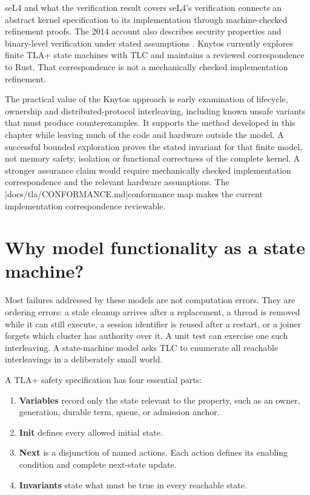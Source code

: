 \begin{architecturalcomparison}{seL4 and what the verification result covers}
seL4's verification connects an abstract kernel specification to its
implementation through machine-checked refinement proofs. The 2014 account
also describes security properties and binary-level verification under stated
assumptions \cite{prior:sel4}. Knytos currently explores finite TLA+
state machines with TLC and maintains a reviewed correspondence to Rust.
That correspondence is not a mechanically checked implementation refinement.

The practical value of the Knytos approach is early examination of
lifecycle, ownership and distributed-protocol interleaving, including known
unsafe variants that must produce counterexamples. It supports the method
developed in this chapter while leaving much of the code and hardware outside
the model. A successful bounded exploration proves the stated invariant for
that finite model, not memory safety, isolation or functional correctness of
the complete kernel. A stronger assurance claim would require mechanically
checked implementation correspondence and the relevant hardware assumptions.
The \repofiletext|docs/tla/CONFORMANCE.md|{conformance map} makes the current
implementation correspondence reviewable.
\end{architecturalcomparison}

\section{Why model functionality as a state machine?}

Most failures addressed by these models are not computation errors. They are
ordering errors: a stale cleanup arrives after a replacement, a thread is
removed while it can still execute, a session identifier is reused after a
restart, or a joiner forgets which cluster has authority over it. A unit test
can exercise one such interleaving. A state-machine model asks TLC to enumerate
all reachable interleavings in a deliberately small world.

A TLA+ safety specification has four essential parts:

\begin{enumerate}
    \item \textbf{Variables} record only the state relevant to the property,
        such as an owner, generation, durable term, queue, or admission anchor.
    \item \textbf{Init} defines every allowed initial state.
    \item \textbf{Next} is a disjunction of named actions. Each action defines
        its enabling condition and complete next-state update.
    \item \textbf{Invariants} state what must be true in every reachable state.
\end{enumerate}

